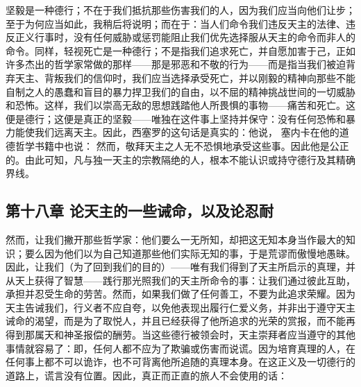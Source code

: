 坚毅是一种德行；不在于我们抵抗那些伤害我们的人，因为我们应当向他们让步；至于为何应当如此，我稍后将说明；而在于：当人们命令我们违反天主的法律、违反正义行事时，没有任何威胁或惩罚能阻止我们优先选择服从天主的命令而非人的命令。同样，轻视死亡是一种德行；不是指我们追求死亡，并自愿加害于己，正如许多杰出的哲学家常做的那样——那是邪恶和不敬的行为——而是指当我们被迫背弃天主、背叛我们的信仰时，我们应当选择承受死亡，并以刚毅的精神向那些不能自制之人的愚蠢和盲目的暴力捍卫我们的自由，以不屈的精神挑战世间的一切威胁和恐怖。这样，我们以崇高无敌的思想践踏他人所畏惧的事物——痛苦和死亡。这便是德行；这便是真正的坚毅——唯独在这件事上坚持并保守：没有任何恐怖和暴力能使我们远离天主。因此，西塞罗的这句话是真实的：他说， 塞内卡在他的道德哲学书籍中也说： 然而，敬拜天主之人无不恐惧地承受这些事。因此他是公正的。由此可知，凡与独一天主的宗教隔绝的人，根本不能认识或持守德行及其精确界线。\par


\subsection{第十八章 论天主的一些诫命，以及论忍耐}

然而，让我们撇开那些哲学家：他们要么一无所知，却把这无知本身当作最大的知识；要么因为他们以为自己知道那些他们实际无知的事，于是荒谬而傲慢地愚昧。因此，让我们（为了回到我们的目的）——唯有我们得到了天主所启示的真理，并从天上获得了智慧——践行那光照我们的天主所命令的事：让我们通过彼此互助，承担并忍受生命的劳苦。然而，如果我们做了任何善工，不要为此追求荣耀。因为天主告诫我们，行义者不应自夸，以免他表现出履行仁爱义务，并非出于遵守天主诫命的渴望，而是为了取悦人，并且已经获得了他所追求的光荣的赏报，而不能再得到那属天和神圣报偿的酬劳。当这些德行被领会时，天主崇拜者应当遵守的其他事情就容易了：即，任何人都不应为了欺骗或伤害而说谎。因为培育真理的人，在任何事上都不可以诡诈，也不可背离他所追随的真理本身。在这正义及一切德行的道路上，谎言没有位置。因此，真正而正直的旅人不会使用的话：\par

\par

